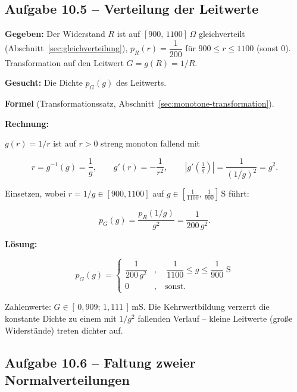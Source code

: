 \subsection*{Aufgabe 10.5 – Verteilung der Leitwerte}

\begin{beispiel}[Funktion einer Zufallsvariablen -- Leitwert $G = 1/R$]

\textbf{Gegeben:} Der Widerstand $R$ ist auf $[900,\,1100]\,\Omega$
gleichverteilt (Abschnitt~\ref{sec:gleichverteilung}),
$p_R(r) = \dfrac{1}{200}$ für $900 \leq r \leq 1100$ (sonst $0$).
Transformation auf den Leitwert $G = g(R) = 1/R$.

\textbf{Gesucht:} Die Dichte $p_G(g)$ des Leitwerts.

\textbf{Formel} (Transformationssatz, Abschnitt~\ref{sec:monotone-transformation}).

\textbf{Rechnung:}

$g(r) = 1/r$ ist auf $r > 0$ streng monoton fallend mit

$$
r = g^{-1}(g) = \frac{1}{g}, \qquad g'(r) = -\frac{1}{r^2}, \qquad
\left|g'\!\left(\tfrac1g\right)\right| = \frac{1}{(1/g)^2} = g^2.
$$

Einsetzen, wobei $r = 1/g \in [900,1100]$ auf
$g \in \left[\tfrac{1}{1100},\,\tfrac{1}{900}\right]\,\text{S}$ führt:

$$
p_G(g) = \frac{p_R(1/g)}{g^2} = \frac{1}{200\, g^2}.
$$

\textbf{Lösung:}

$$
\boxed{\;p_G(g) = \begin{cases}
\dfrac{1}{200\, g^2} & , \quad \dfrac{1}{1100} \leq g \leq \dfrac{1}{900}\;\text{S} \\[10pt]
0 & , \quad \text{sonst.}
\end{cases}\;}
$$

Zahlenwerte: $G \in [\,0{,}909;\, 1{,}111\,]\,\text{mS}$. Die Kehrwertbildung
verzerrt die konstante Dichte zu einem mit $1/g^2$ fallenden Verlauf -- kleine
Leitwerte (große Widerstände) treten dichter auf.

\end{beispiel}

\subsection*{Aufgabe 10.6 – Faltung zweier Normalverteilungen}


